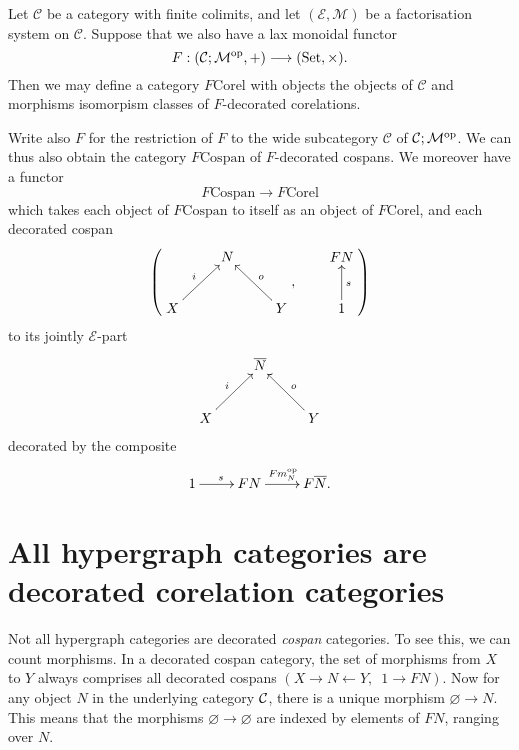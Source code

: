 \begin{corollary}
  Let $\mathcal C$ be a category with finite colimits, and let $(\mathcal E,
  \mathcal M)$ be a factorisation system on $\mathcal C$. Suppose that we also
  have a lax monoidal functor
  \[
    F: (\mathcal C;\mathcal M^{\mathrm{op}},+) \longrightarrow (\mathrm{Set}, \times).
  \]
  Then we may define a category $F\mathrm{Corel}$ with objects the objects of
  $\mathcal C$ and morphisms isomorpism classes of $F$-decorated corelations.

  Write also $F$ for the restriction of $F$ to the wide subcategory $\mathcal
  C$ of $\mathcal C;\mathcal M^{\mathrm{op}}$. We can thus also obtain the category
  $F\mathrm{Cospan}$ of
  $F$-decorated cospans. We moreover have a functor 
  \[
    F\mathrm{Cospan} \to F\mathrm{Corel}
  \]
  which takes each object of $F\mathrm{Cospan}$ to itself as an object of
  $F\mathrm{Corel}$, and each decorated cospan
  \[
    \left(
    \begin{aligned}
      \xymatrix{
	& N \\  
	X \ar[ur]^{i} && Y \ar[ul]_{o}
      }
    \end{aligned}
    ,
    \qquad
    \begin{aligned}
      \xymatrix{
	FN \\
	1 \ar[u]_{s}
      }
    \end{aligned}
    \right)
  \]  
  to its jointly $\mathcal E$-part
  \[
    \xymatrix{
      & \overline{N} \\  
      X \ar[ur]^{i} && Y \ar[ul]_{o}
    }
  \]
  decorated by the composite
  \[
    \xymatrix{
      1 \ar[r]^s & FN \ar[r]^{Fm_N^\opp} & F\overline{N}.
    }
  \]
\end{corollary}


\section{All hypergraph categories are decorated corelation categories}
\label{sec.allhypergraphs}

Not all hypergraph categories are decorated \emph{cospan} categories. To see
this, we can count morphisms. In a decorated cospan category, the set of
morphisms from $X$ to $Y$ always comprises all decorated cospans $(X \to N
\leftarrow Y,\enspace 1 \to FN)$. Now for any object $N$ in the underlying
category $\mathcal C$, there is a unique morphism $\varnothing \to N$. This means
that the morphisms $\varnothing \to \varnothing$ are indexed by elements of
$FN$, ranging over $N$.

